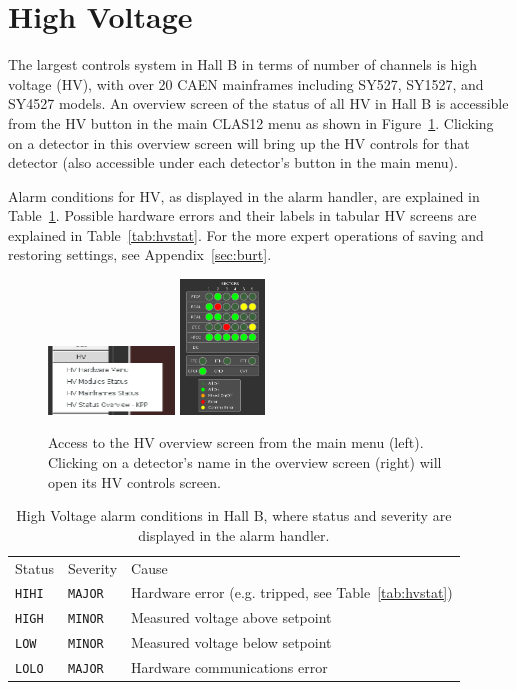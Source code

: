 \documentclass[amsmath,amssymb,notitlepage,11pt]{revtex4}
\begin{document}
\clearpage

\section{High Voltage}
The largest controls system in Hall B in terms of number of channels is high voltage (HV), with over 20 CAEN mainframes including SY527, SY1527, and SY4527 models.  An overview screen of the status of all HV in Hall B is accessible from the HV button in the main CLAS12 menu as shown in Figure~\ref{fig:hv}.  Clicking on a detector in this overview screen will bring up the HV controls for that detector (also accessible under each detector's button in the main menu).

Alarm conditions for HV, as displayed in the alarm handler, are explained in Table~\ref{tab:hvalarm}.  Possible hardware errors and their labels in tabular HV screens are explained in Table~\ref{tab:hvstat}.  For the more expert operations of saving and restoring settings, see Appendix~\ref{sec:burt}.

\begin{figure}[htbp]\centering
  \includegraphics[width=0.3\textwidth]{pics/hvmenu}
  \includegraphics[width=0.2\textwidth]{pics/hvstat}
  \caption{Access to the HV overview screen from the main menu (left).  Clicking on a detector's name in the overview screen (right) will open its HV controls screen.\label{fig:hv}}
\end{figure}

\begin{table}[htpb]\centering
  \begin{tabular}{lll} \toprule[1.5pt]
    Status        & Severity & Cause \\ \cmidrule[0.5pt]{1-3}
    \texttt{HIHI} & \texttt{MAJOR} & Hardware error (e.g. tripped, see Table~\ref{tab:hvstat})\\
    \texttt{HIGH} & \texttt{MINOR} & Measured voltage above setpoint\\
    \texttt{LOW}  & \texttt{MINOR} & Measured voltage below setpoint\\
    \texttt{LOLO} & \texttt{MAJOR} & Hardware communications error\\
  \bottomrule[1.5pt]
  \end{tabular}
  \caption{High Voltage alarm conditions in Hall B, where status and severity are displayed in the alarm handler.\label{tab:hvalarm}}  
\end{table}
\end{document}
